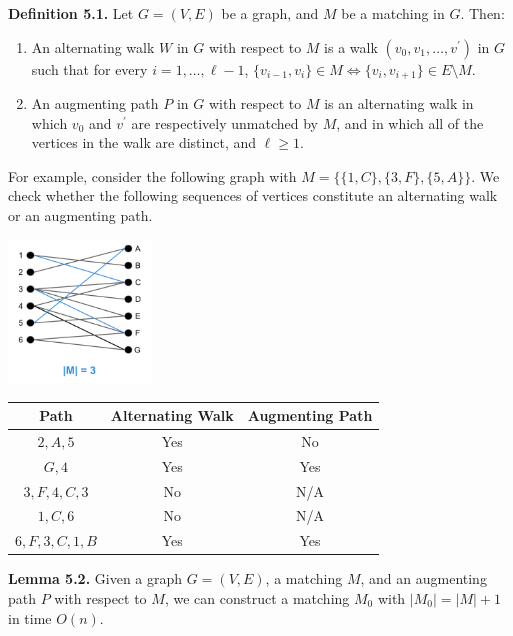 \documentclass[10pt,landscape]{article}
\begin{document}
\begin{multicols*}{3}
\textbf{Definition 5.1.} Let $G = (V, E)$ be a graph, and $M$ be a matching in $G$. Then:
\begin{enumerate}
\item An alternating walk $W$ in $G$ with respect to $M$ is a walk $(v_0, v_1, \ldots, v^\prime)$ in $G$ such that for every $i = 1, \ldots, \ell - 1$, $\{v_{i-1}, v_i\} \in M \Leftrightarrow \{v_i, v_{i+1}\} \in E \setminus M$.
\item An augmenting path $P$ in $G$ with respect to $M$ is an alternating walk in which $v_0$ and $v^\prime$ are respectively unmatched by $M$, and in which all of the vertices in the walk are distinct, and $\ell \geq 1$.
\end{enumerate}

For example, consider the following graph with $M = \{\{1, C\}, \{3, F\}, \{5, A\}\}$.
We check whether the following sequences of vertices constitute an alternating walk or an augmenting path.

\begin{minipage}{\linewidth}
            \centering
\includegraphics[width=1.5in]{figures/graph.png}
        \end{minipage}

\begin{center}
\begin{tabular}{|c|c|c|}
\hline
Path & Alternating Walk & Augmenting Path \\
\hline
$2, A, 5$ & Yes & No \\
$G, 4$ & Yes & Yes \\
$3, F, 4, C, 3$ & No & N/A \\
$1, C, 6$ & No & N/A \\
$6, F, 3, C, 1, B$ & Yes & Yes \\
\hline
\end{tabular}
\end{center}

\textbf{Lemma 5.2.} Given a graph $G = (V, E)$, a matching $M$, and an augmenting path $P$ with respect to $M$, we can construct a matching $M_0$ with $|M_0| = |M| + 1$ in time $O(n)$.

\smallskip


\end{multicols*}
\end{document}
